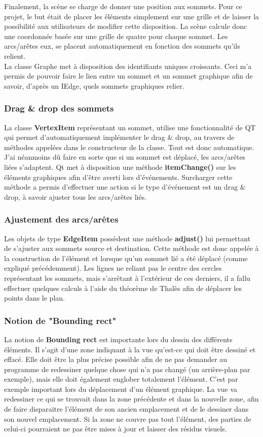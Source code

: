 \documentclass[french]{article}
\begin{document}
	Finalement, la scène se charge de donner une position aux sommets. Pour ce projet, le but était de placer les éléments simplement sur une grille et de laisser la possibilité aux utilisateurs de modifier cette disposition. La scène calcule donc une coordonnée basée sur une grille de quatre pour chaque sommet. Les arcs/arêtes eux, se placent automatiquement en fonction des sommets qu'ils relient. \\
	La classe Graphe met à disposition des identifiants uniques croissants. Ceci m'a permis de pouvoir faire le lien entre un sommet et un sommet graphique afin de savoir, d'après un IEdge, quels sommets graphiques relier.
	
	\subsubsection{Drag \& drop des sommets}
	La classe \textbf{VertexItem} représentant un sommet, utilise une fonctionnalité de QT qui permet d'automatiquement implémenter le drag \& drop, au travers de méthodes appelées dans le constructeur de la classe. Tout est donc automatique. \\
	J'ai néanmoins dû faire en sorte que si un sommet est déplacé, les arcs/arêtes liées s'adaptent. Qt met à disposition une méthode \textbf{itemChange()} sur les éléments graphiques afin d'être averti lors d'événements. Surcharger cette méthode a permis d'effectuer une action si le type d'événement est un drag \& drop, à savoir ajuster tous les arcs/arêtes liés.
	
	\subsubsection{Ajustement des arcs/arêtes}
	Les objets de type \textbf{EdgeItem} possèdent une méthode \textbf{adjust()} lui permettant de s'ajuster aux sommets source et destination. Cette méthode est donc appelée à la construction de l'élément et lorsque qu'un sommet lié a été déplacé (comme expliqué précédemment). Les lignes ne reliant pas le centre des cercles représentant les sommets, mais s'arrêtant à l'extérieur de ces derniers, il a fallu effectuer quelques calculs à l'aide du théorème de Thalès afin de déplacer les points dans le plan.
	
	\subsubsection{Notion de "Bounding rect"}
	La notion de \textbf{Bounding rect} est importante lors du dessin des différents éléments. Il s'agit d'une zone indiquant à la vue qu'est-ce qui doit être dessiné et effacé. Elle doit être la plus précise possible afin de ne pas demander au programme de redessiner quelque chose qui n'a pas changé (un arrière-plan par exemple), mais elle doit également englober totalement l'élément. C'est par exemple important lors du déplacement d'un élément graphique. La vue va redessiner ce qui se trouvait dans la zone précédente et dans la nouvelle zone, afin de faire disparaitre l'élément de son ancien emplacement et de le dessiner dans son nouvel emplacement. Si la zone ne couvre pas tout l'élément, des parties de celui-ci pourraient ne pas être mises à jour et laisser des résidus visuels.
	
\end{document}
